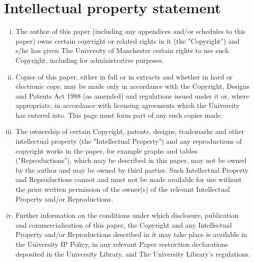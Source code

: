 \documentclass[nocrop]{bioinfo}
\begin{document}
\section{Intellectual property statement}
\begin{enumerate}[i. ]

\item  The author of this paper (including any appendices and/or schedules to this paper) owns certain copyright or related rights in it (the "Copyright") and s/he has given The University of Manchester certain rights to use such Copyright, including for administrative purposes.

\item Copies of this paper, either in full or in extracts and whether in hard or electronic copy, may be made only in accordance with the Copyright, Designs and Patents Act 1988 (as amended) and regulations issued under it or, where appropriate, in accordance with licensing agreements which the University has entered into. This page must form part of any such copies made. 

\item The ownership of certain Copyright, patents, designs, trademarks and other intellectual property (the "Intellectual Property") and any reproductions of copyright works in the paper, for example graphs and tables ("Reproductions"), which may be described in this paper, may not be owned by the author and may be owned by third parties. Such Intellectual Property and Reproductions cannot and must not be made available for use without the prior written permission of the owner(s) of the relevant Intellectual Property and/or Reproductions.

\item Further information on the conditions under which disclosure, publication and commercialisation of this paper, the Copyright and any Intellectual Property and/or Reproductions described in it may take place is available in the University IP Policy, in any relevant Paper restriction declarations deposited in the University Library, and The University Library's regulations.

\end{enumerate}



\nocite{*}

\end{document}
